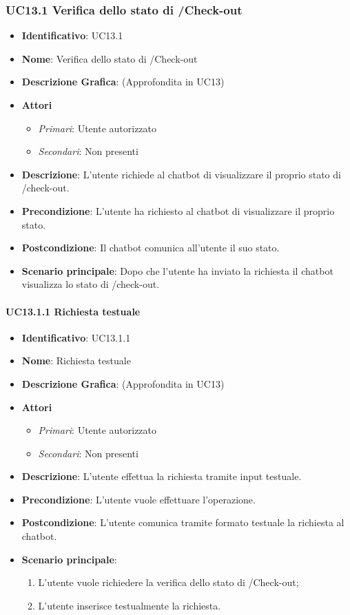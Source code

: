 \subsubsection{UC13.1 Verifica dello stato di /Check-out}
\begin{itemize}
	\item \textbf{Identificativo}: UC13.1
	\item \textbf{Nome}: Verifica dello stato di /Check-out
	\item \textbf{Descrizione Grafica}: (Approfondita in UC13)
	\item \textbf{Attori}
	\begin{itemize}
		\item \textit{Primari}: Utente autorizzato
		\item \textit{Secondari}: Non presenti
	\end{itemize}
	\item \textbf{Descrizione}: L'utente richiede al chatbot di visualizzare il proprio stato di /check-out.
	\item \textbf{Precondizione}: L'utente ha richiesto al chatbot di visualizzare il proprio stato.
	\item \textbf{Postcondizione}: Il chatbot comunica all'utente il suo stato.
	\item \textbf{Scenario principale}: Dopo che l'utente ha inviato la richiesta il chatbot visualizza lo stato di /check-out.
\end{itemize}

\paragraph{UC13.1.1 Richiesta testuale}
\begin{itemize}
	\item \textbf{Identificativo}: UC13.1.1
	\item \textbf{Nome}: Richiesta testuale
	\item \textbf{Descrizione Grafica}: (Approfondita in UC13)
	\item \textbf{Attori}
	\begin{itemize}
		\item \textit{Primari}: Utente autorizzato
		\item \textit{Secondari}: Non presenti
	\end{itemize}
	\item \textbf{Descrizione}: L'utente effettua la richiesta tramite input testuale.
	\item \textbf{Precondizione}: L'utente vuole effettuare l'operazione.
	\item \textbf{Postcondizione}: L'utente comunica tramite formato testuale la richiesta al chatbot.
	\item \textbf{Scenario principale}: 
	\begin{enumerate}
		\item L'utente vuole richiedere la verifica dello stato di /Check-out;
		\item L'utente inserisce testualmente la richiesta.
	\end{enumerate}
\end{itemize}

